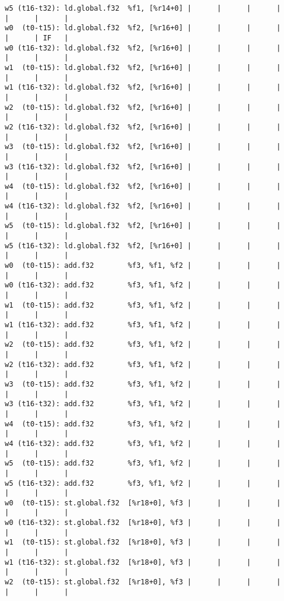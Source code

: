 \documentclass[11pt]{article}
\begin{document}
\begin{Answer}
\begin{verbatim}
w5 (t16-t32): ld.global.f32  %f1, [%r14+0] |      |      |      |      |      |      |
w0  (t0-t15): ld.global.f32  %f2, [%r16+0] |      |      |      |      |      | IF   |
w0 (t16-t32): ld.global.f32  %f2, [%r16+0] |      |      |      |      |      |      |
w1  (t0-t15): ld.global.f32  %f2, [%r16+0] |      |      |      |      |      |      |
w1 (t16-t32): ld.global.f32  %f2, [%r16+0] |      |      |      |      |      |      |
w2  (t0-t15): ld.global.f32  %f2, [%r16+0] |      |      |      |      |      |      |
w2 (t16-t32): ld.global.f32  %f2, [%r16+0] |      |      |      |      |      |      |
w3  (t0-t15): ld.global.f32  %f2, [%r16+0] |      |      |      |      |      |      |
w3 (t16-t32): ld.global.f32  %f2, [%r16+0] |      |      |      |      |      |      |
w4  (t0-t15): ld.global.f32  %f2, [%r16+0] |      |      |      |      |      |      |
w4 (t16-t32): ld.global.f32  %f2, [%r16+0] |      |      |      |      |      |      |
w5  (t0-t15): ld.global.f32  %f2, [%r16+0] |      |      |      |      |      |      |
w5 (t16-t32): ld.global.f32  %f2, [%r16+0] |      |      |      |      |      |      |
w0  (t0-t15): add.f32        %f3, %f1, %f2 |      |      |      |      |      |      |
w0 (t16-t32): add.f32        %f3, %f1, %f2 |      |      |      |      |      |      |
w1  (t0-t15): add.f32        %f3, %f1, %f2 |      |      |      |      |      |      |
w1 (t16-t32): add.f32        %f3, %f1, %f2 |      |      |      |      |      |      |
w2  (t0-t15): add.f32        %f3, %f1, %f2 |      |      |      |      |      |      |
w2 (t16-t32): add.f32        %f3, %f1, %f2 |      |      |      |      |      |      |
w3  (t0-t15): add.f32        %f3, %f1, %f2 |      |      |      |      |      |      |
w3 (t16-t32): add.f32        %f3, %f1, %f2 |      |      |      |      |      |      |
w4  (t0-t15): add.f32        %f3, %f1, %f2 |      |      |      |      |      |      |
w4 (t16-t32): add.f32        %f3, %f1, %f2 |      |      |      |      |      |      |
w5  (t0-t15): add.f32        %f3, %f1, %f2 |      |      |      |      |      |      |
w5 (t16-t32): add.f32        %f3, %f1, %f2 |      |      |      |      |      |      |
w0  (t0-t15): st.global.f32  [%r18+0], %f3 |      |      |      |      |      |      |
w0 (t16-t32): st.global.f32  [%r18+0], %f3 |      |      |      |      |      |      |
w1  (t0-t15): st.global.f32  [%r18+0], %f3 |      |      |      |      |      |      |
w1 (t16-t32): st.global.f32  [%r18+0], %f3 |      |      |      |      |      |      |
w2  (t0-t15): st.global.f32  [%r18+0], %f3 |      |      |      |      |      |      |

\end{verbatim}
\end{Answer}
\end{document}
